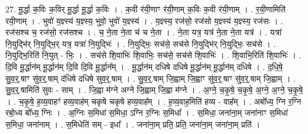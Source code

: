 \documentclass[17pt]{extarticle}
\begin{document}
27. मू॒र्द्धा क॒विः क॒विर् मू॒र्द्धा मू॒र्द्धा क॒विः । . क॒वी र॑यी॒णाꣳ र॑यी॒णाम् क॒विः क॒वी र॑यी॒णाम् । . र॒यी॒णामिति॑ रयी॒णाम् । . भुवो॑ य॒ज्ञ्स्य॑ य॒ज्ञ्स्य॒ भुवो॒ भुवो॑ य॒ज्ञ्स्य॑ । . य॒ज्ञ्स्य॒ रज॑सो॒ रज॑सो य॒ज्ञ्स्य॑ य॒ज्ञ्स्य॒ रज॑सः । . रज॑सश्च च॒ रज॑सो॒ रज॑सश्च । . च॒ ने॒ता ने॒ता च॑ च ने॒ता । . ने॒ता यत्र॒ यत्र॑ ने॒ता ने॒ता यत्र॑ । . यत्रा॑ नि॒युद्भि॑र् नि॒युद्भि॒र् यत्र॒ यत्रा॑ नि॒युद्भिः॑ । . नि॒युद्भिः॒ सच॑से॒ सच॑से नि॒युद्भि॑र् नि॒युद्भिः॒ सच॑से । . नि॒युद्भि॒रिति॑ नि॒युत् - भिः॒ । . सच॑से शि॒वाभिः॑ शि॒वाभिः॒ सच॑से॒ सच॑से शि॒वाभिः॑ । . शि॒वाभि॒रिति॑ शि॒वाभिः॑ । . दि॒वि मू॒र्द्धान॑म् मू॒र्द्धान॑म् दि॒वि दि॒वि मू॒र्द्धान᳚म् । . मू॒र्द्धान॑म् दधिषे दधिषे मू॒र्द्धान॑म् मू॒र्द्धान॑म् दधिषे । . द॒धि॒षे॒ सु॒व॒र्॒.षाꣳ सु॑व॒र्॒.षाम् द॑धिषे दधिषे सुव॒र्॒.षाम् । . सु॒व॒र्॒.षाम् जि॒ह्वाम् जि॒ह्वाꣳ सु॑व॒र्॒.षाꣳ सु॑व॒र्॒.षाम् जि॒ह्वाम् । . सु॒व॒र्॒.षामिति॑ सुवः - साम् । . जि॒ह्वा म॑ग्ने अग्ने जि॒ह्वाम् जि॒ह्वा म॑ग्ने । . अ॒ग्ने॒ च॒कृ॒षे॒ च॒कृ॒षे॒ अ॒ग्ने॒ अ॒ग्ने॒ च॒कृ॒षे॒ । . च॒कृ॒षे॒ ह॒व्य॒वाहꣳ॑ हव्य॒वाह॑म् चकृषे चकृषे हव्य॒वाह᳚म् । . ह॒व्य॒वाह॒मिति॑ हव्य - वाह᳚म् । . अबो᳚ध्य॒ ग्नि र॒ग्नि रबो॒ध्य बो᳚ध्य॒ ग्निः । . अ॒ग्निः स॒मिधा॑ स॒मिधा॒ ऽग्नि र॒ग्निः स॒मिधा᳚ । . स॒मिधा॒ जना॑ना॒म् जना॑नाꣳ स॒मिधा॑ स॒मिधा॒ जना॑नाम् । . स॒मिधेति॑ सम् - इधा᳚ । . जना॑ना॒म् प्रति॒ प्रति॒ जना॑ना॒म् जना॑ना॒म् प्रति॑ । \newline
\end{document}
